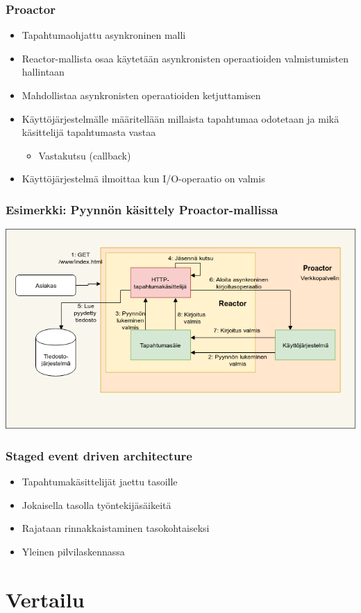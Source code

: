 \documentclass{beamer}
\begin{document}
\begin{frame}
  \frametitle{Proactor}
  \begin{itemize}
    \item Tapahtumaohjattu asynkroninen malli
    \item Reactor-mallista osaa käytetään asynkronisten
      operaatioiden valmistumisten hallintaan
    \item Mahdollistaa asynkronisten operaatioiden ketjuttamisen
    \item Käyttöjärjestelmälle määritellään millaista tapahtumaa
      odotetaan ja mikä käsittelijä tapahtumasta vastaa
      \begin{itemize}
        \item Vastakutsu (callback)
      \end{itemize}
    \item Käyttöjärjestelmä ilmoittaa kun I/O-operaatio on valmis
  \end{itemize}
\end{frame}
\begin{frame}
  \frametitle{Esimerkki: Pyynnön käsittely Proactor-mallissa}
  \includegraphics[scale=0.5]{Proactor.png}
\end{frame}
\begin{frame}
  \frametitle{Staged event driven architecture}
  \begin{itemize}
    \item Tapahtumakäsittelijät jaettu tasoille
    \item Jokaisella tasolla työntekijäsäikeitä
    \item Rajataan rinnakkaistaminen tasokohtaiseksi
    \item Yleinen pilvilaskennassa
  \end{itemize}
\end{frame}
\section{Vertailu}
\end{document}
